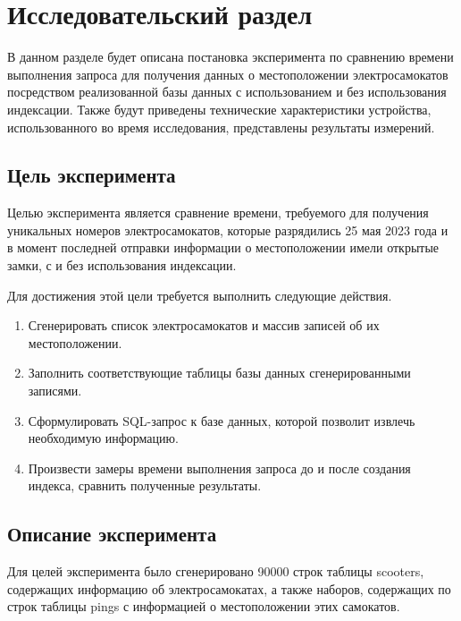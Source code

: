 \chapter{Исследовательский раздел}

В данном разделе будет описана постановка эксперимента по сравнению времени выполнения запроса для получения данных о местоположении электросамокатов посредством реализованной базы данных с использованием и без использования индексации. Также будут приведены технические характеристики устройства, использованного во время исследования, представлены результаты измерений.

\section{Цель эксперимента}

Целью эксперимента является сравнение времени, требуемого для получения уникальных номеров электросамокатов, которые разрядились 25 мая 2023 года и в момент последней отправки информации о местоположении имели открытые замки, с и без использования индексации.

Для достижения этой цели требуется выполнить следующие действия.

\begin{enumerate}
    \item Сгенерировать список электросамокатов и массив записей об их местоположении.
    \item Заполнить соответствующие таблицы базы данных сгенерированными записями.
    \item Сформулировать SQL-запрос к базе данных, которой позволит извлечь необходимую информацию.
    \item Произвести замеры времени выполнения запроса до и после создания индекса, сравнить полученные результаты.
\end{enumerate}

\section{Описание эксперимента}


Для целей эксперимента было сгенерировано \num{90000} строк таблицы scooters, содержащих информацию об электросамокатах, а также  наборов, содержащих по  строк таблицы pings с информацией о местоположении этих самокатов.

